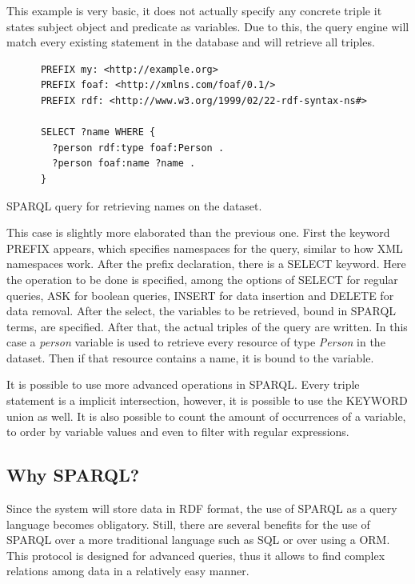 This example is very basic, it does not actually specify any concrete triple it states subject object and predicate as variables. Due to this, the query engine will match every existing statement in the database and will retrieve all triples.

\begin{listing}\centering
  \begin{minipage}{.4\textwidth}
    \begin{verbatim}
      PREFIX my: <http://example.org>
      PREFIX foaf: <http://xmlns.com/foaf/0.1/>
      PREFIX rdf: <http://www.w3.org/1999/02/22-rdf-syntax-ns#>
      
      SELECT ?name WHERE {
      	?person rdf:type foaf:Person .
      	?person foaf:name ?name .
      }
    \end{verbatim}
  \end{minipage}
  \caption{SPARQL query for retrieving names on the dataset.}\label{lst:sparqlmedium}
\end{listing}

This case is slightly more elaborated than the previous one. First the keyword PREFIX appears, which specifies namespaces for the query, similar to how XML namespaces work. After the prefix declaration, there is a SELECT keyword. Here the operation to be done is specified, among the options of SELECT for regular queries, ASK for boolean queries, INSERT for data insertion and DELETE for data removal. After the select, the variables to be retrieved, bound in SPARQL terms, are specified. After that, the actual triples of the query are written. In this case a \textit{person} variable is used to retrieve every resource of type \textit{Person} in the dataset. Then if that resource contains a name, it is bound to the variable.

It is possible to use more advanced operations in SPARQL. Every triple statement is a implicit intersection, however, it is possible to use the KEYWORD union as well. It is also possible to count the amount of occurrences of a variable, to order by variable values and even to filter with regular expressions.

\subsection*{Why SPARQL?}

Since the system will store data in RDF format, the use of SPARQL as a query language becomes obligatory. Still, there are several benefits for the use of SPARQL over a more traditional language such as SQL or over using a ORM. This protocol is designed for advanced queries, thus it allows to find complex relations among data in a relatively easy manner. 

